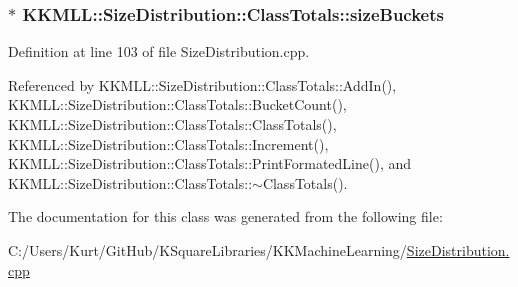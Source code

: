 \subsubsection[{\texorpdfstring{size\+Buckets}{sizeBuckets}}]{$\ast$ K\+K\+M\+L\+L\+::\+Size\+Distribution\+::\+Class\+Totals\+::size\+Buckets}\hypertarget{class_size_distribution_1_1_class_totals_a61245bf9b17ab9b90d989ab4f8dd2fea}{}\label{class_size_distribution_1_1_class_totals_a61245bf9b17ab9b90d989ab4f8dd2fea}


Definition at line 103 of file Size\+Distribution.\+cpp.



Referenced by K\+K\+M\+L\+L\+::\+Size\+Distribution\+::\+Class\+Totals\+::\+Add\+In(), K\+K\+M\+L\+L\+::\+Size\+Distribution\+::\+Class\+Totals\+::\+Bucket\+Count(), K\+K\+M\+L\+L\+::\+Size\+Distribution\+::\+Class\+Totals\+::\+Class\+Totals(), K\+K\+M\+L\+L\+::\+Size\+Distribution\+::\+Class\+Totals\+::\+Increment(), K\+K\+M\+L\+L\+::\+Size\+Distribution\+::\+Class\+Totals\+::\+Print\+Formated\+Line(), and K\+K\+M\+L\+L\+::\+Size\+Distribution\+::\+Class\+Totals\+::$\sim$\+Class\+Totals().



The documentation for this class was generated from the following file\+:\begin{DoxyCompactItemize}
\item 
C\+:/\+Users/\+Kurt/\+Git\+Hub/\+K\+Square\+Libraries/\+K\+K\+Machine\+Learning/\hyperlink{_size_distribution_8cpp}{Size\+Distribution.\+cpp}\end{DoxyCompactItemize}
